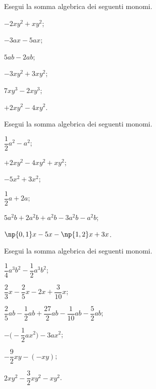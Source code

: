\begin{esercizio}[\Ast]
 \label{ese:10.26} %
Esegui la somma algebrica dei seguenti monomi.
\begin{multicols}{3}
\begin{enumeratea}
 \item $-2xy^{2}+xy^{2}$;
 \item $-3ax-5ax$;
 \item $5ab-2ab$;
 \item $-3xy^{2}+3xy^{2}$;
 \item $7xy^{3}-2xy^{3}$;
 \item $+2xy^{2}-4xy^{2}$.
\end{enumeratea}
\end{multicols}
\end{esercizio}

\begin{esercizio}[\Ast]
 \label{ese:10.27} %
Esegui la somma algebrica dei seguenti monomi.
\begin{multicols}{2}
\begin{enumeratea}
 \item $\dfrac{1}{2}a^{2}-a^{2}$;
 \item $+2xy^{2}-4xy^{2}+xy^{2}$;
 \item $-5x^{2}+3x^{2}$;
 \item $\dfrac{1}{2}a+2a$;
 \item $5a^{2}b+2a^{2}b+a^{2}b-3a^{2}b-a^{2}b$;
 \item $\np{0,1}x-5x-\np{1,2}x+3x$.
\end{enumeratea}
\end{multicols}
\end{esercizio}

\begin{esercizio}[\Ast]
 \label{ese:10.28} %
Esegui la somma algebrica dei seguenti monomi.
\begin{multicols}{2}
\begin{enumeratea}
\spazielenx
 \item $\dfrac{1}{4}a^{3}b^{2}-\dfrac{1}{2}a^{3}b^{2}$;
 \item $\dfrac{2}{3}x-\dfrac{2}{5}x-2x+\dfrac{3}{10}x$;
 \item $\dfrac{2}{5}ab-\dfrac{1}{2}ab+\dfrac{27}{2}ab-\dfrac{1}{10}ab-\dfrac{5}{2}ab$;
 \item $-\bigg(-{\dfrac{1}{2}}ax^{2}\bigg)-3ax^{2}$;
 \item $-{\dfrac{9}{2}}xy-(-xy)$;
 \item $2xy^{2}-\dfrac{3}{2}xy^{2}-xy^{2}$.
\end{enumeratea}
\end{multicols}
\end{esercizio}

